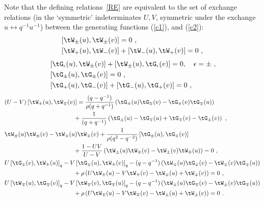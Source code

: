 \documentclass[11pt]{amsart}
\numberwithin{equation}{section}
\numberwithin{equation}{section}
\begin{document}
\begin{appendix}
	Note that the defining relations~\eqref{RE}  are equivalent to the set of exchange relations (in the `symmetric' indeterminates $U,V$, symmetric under the exchange $ u \leftrightarrow q^{-1}u^{-1}$) between the generating functions (\ref{c1}), and (\ref{c2}):
	\begin{align}\label{eq1-Aq} \left [ \tW_\pm(u),\tW_\pm(v) \right ]&=0 \ ,  \\ 
		\label{eq2-Aq}\left [ \tW_+(u),\tW_-(v) \right] &+ \left [ \tW_-(u),\tW_+(v) \right ] =0 \ ,
	\end{align}
	\begin{align}
		\label{eq3-Aq}&	\left [ \tG_\epsilon(u),\tW_\pm(v) \right ] + \left [ \tW_\pm(u),\tG_\epsilon(v) \right ] =0, \quad  \epsilon=\pm \ , \\
		\label{eq4-Aq}&	\left [ \tG_\pm(u),\tG_\pm(v) \right ] =0\ , \\
		\label{eq5-Aq}&	\left [ \tG_+(u),\tG_-(v) \right ] + \left [ \tG_-(u), \tG_+(v) \right ]=0\ ,
	\end{align}
	\vspace{-5mm}
	\begin{align}
		\label{eq6-Aq}&(U-V) \left [ \tW_\pm(u),\tW_\mp(v) \right ]= \frac{(q-q^{-1})}{\rho(q+q^{-1})} \left ( \tG_\pm(u) \tG_\mp(v)-\tG_\pm(v) \tG_\mp(u) \right )\\ \nonumber
		&\hspace{4cm}	+ \frac{1}{(q+q^{-1})} \left ( \tG_\pm(u) -\tG_\mp(u)+\tG_\mp(v)-\tG_\pm(v) \right )\ ,\\
		\label{eq7-Aq}	&\tW_\pm(u)\tW_\pm(v)-\tW_\mp(u)\tW_\mp(v)+\frac{1}{\rho(q^2-q^{-2})}\left [ \tG_\pm(u),\tG_\mp(v)\right] \\ \nonumber
		&\hspace{4cm}	+ \frac{1- UV}{U-V}\left ( \tW_\pm(u)\tW_\mp(v)-\tW_\pm(v)\tW_\mp(u)\right) =0 \ , \\
		\label{eq8-Aq}&	U \left [ \tG_\mp(v), \tW_\pm(u) \right ]_q -V\left [ \tG_\mp(u),\tW_\pm(v)\right ]_q -(q-q^{-1})\left ( \tW_\mp(u)\tG_\mp(v) - \tW_\mp(v) \tG_\mp(u) \right ) \\ \nonumber
		&\hspace{4cm}	+ \rho \left ( U \tW_\pm(u) - V \tW_\pm(v) - \tW_\mp(u)+\tW_\mp(v) \right )=0 \ , \\ 
		\label{eq9-Aq}&	U \left [ \tW_\mp(u),\tG_\mp(v)\right ]_q - V \left [ \tW_\mp(v),\tG_\mp(u) \right ]_q -(q-q^{-1}) \left(\tW_\pm(u) \tG_\mp(v) - \tW_\pm(v) \tG_\mp(u) \right ) \\ \nonumber
		&\hspace{4cm}	+ \rho \left( U \tW_\mp(u)-V\tW_\mp(v) - \tW_\pm(u) +\tW_\pm(v) \right ) =0 \ .
	\end{align}
	\smallskip
	

\end{appendix}
\end{document}
